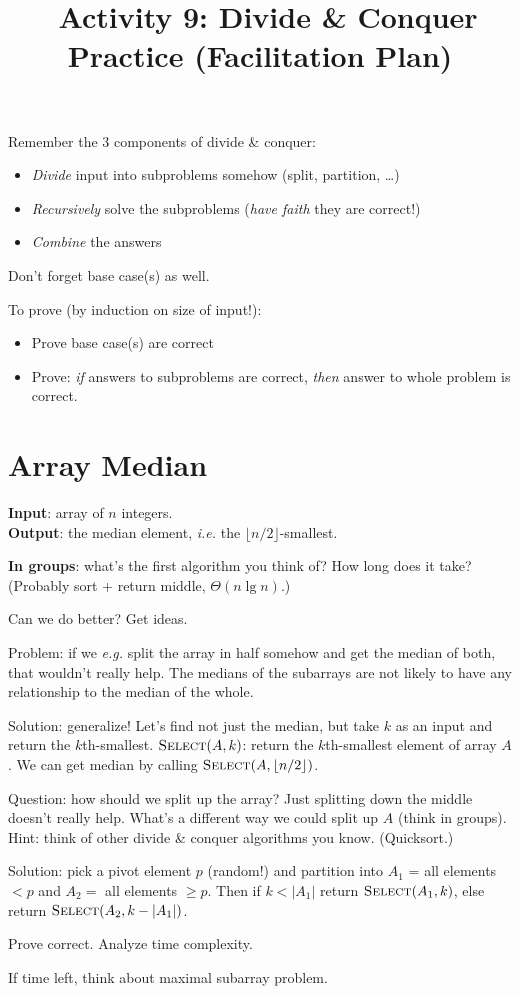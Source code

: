 \documentclass{tufte-handout}
\title{\thecourse\ Activity 9: Divide \& Conquer Practice
  (Facilitation Plan)}
\date{}
\begin{document}
\maketitle

Remember the 3 components of divide \& conquer:
\begin{itemize}
\item \emph{Divide} input into subproblems somehow (split, partition, \dots)
\item \emph{Recursively} solve the subproblems (\emph{have faith} they
  are correct!)
\item \emph{Combine} the answers
\end{itemize}

Don't forget base case(s) as well.

To prove (by induction on size of input!):
\begin{itemize}
\item Prove base case(s) are correct
\item Prove: \emph{if} answers to subproblems are correct, \emph{then}
  answer to whole problem is correct.
\end{itemize}

\section{Array Median}

\noindent
\textbf{Input}: array of $n$ integers. \\
\noindent
\textbf{Output}: the median element, \emph{i.e.} the $\lfloor n/2
\rfloor$-smallest. \bigskip

\textbf{In groups}: what's the first algorithm you think of?  How long
does it take? (Probably sort + return middle, $\Theta(n \lg n)$.)

Can we do better?  Get ideas.

Problem: if we \emph{e.g.} split the array in half somehow and get the
median of both, that wouldn't really help.  The medians of the
subarrays are not likely to have any relationship to the median of the
whole.

Solution: generalize!  Let's find not just the median, but take $k$ as
an input and return the $k$th-smallest.  $\textsc{Select}(A,k)$:
return the $k$th-smallest element of array $A$.  We can get median by
calling $\textsc{Select}(A, \lfloor n/2 \rfloor)$.

Question: how should we split up the array?  Just splitting down the
middle doesn't really help.  What's a different way we could split up
$A$ (think in groups). Hint: think of other divide \& conquer
algorithms you know. (Quicksort.)

Solution: pick a pivot element $p$ (random!) and partition into $A_1$
= all elements $<p$
and $A_2 =$ all elements $\geq p$.  Then if $k < |A_1|$ return
$\textsc{Select}(A_1, k)$, else return $\textsc{Select}(A_2, k - |A_1|)$.

Prove correct.  Analyze time complexity.

If time left, think about maximal subarray problem.
\end{document}
